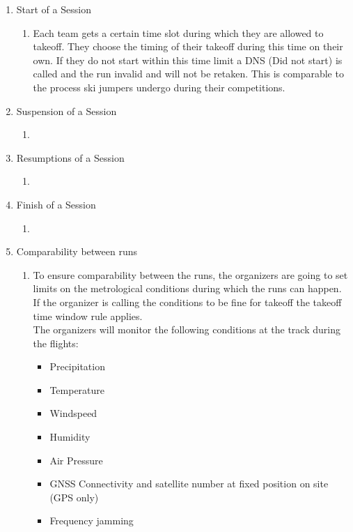 \begin{enumerate}
    \item{Start of a Session}
    \begin{enumerate}
      \item Each team gets a certain time slot during which they are allowed to takeoff. They choose the timing of their takeoff during this time on their own. If they do not start within this time limit a DNS (Did not start) is called and the run invalid and will not be retaken. This is comparable to the process ski jumpers undergo during their competitions. 
    \end{enumerate}

    \item{Suspension of a Session}
    \begin{enumerate}
      \item 
    \end{enumerate}

    \item{Resumptions of a Session }
    \begin{enumerate}
      \item 
    \end{enumerate}

    \item{Finish of a Session}
    \begin{enumerate}
      \item 
    \end{enumerate}

    \item{Comparability between runs}
    \begin{enumerate}
      \item To ensure comparability between the runs, the organizers are going to set limits on the metrological conditions during which the runs can happen. If the organizer is calling the conditions to be fine for takeoff the takeoff time window rule applies. \\
      The organizers will monitor the following conditions at the track during the flights:
      \begin{itemize}
        \item Precipitation
        \item Temperature 
        \item Windspeed
        \item Humidity
        \item Air Pressure
        \item GNSS Connectivity and satellite number at fixed position on site (GPS only) 
        \item Frequency jamming
      \end{itemize}

    \end{enumerate}
  
\end{enumerate}



